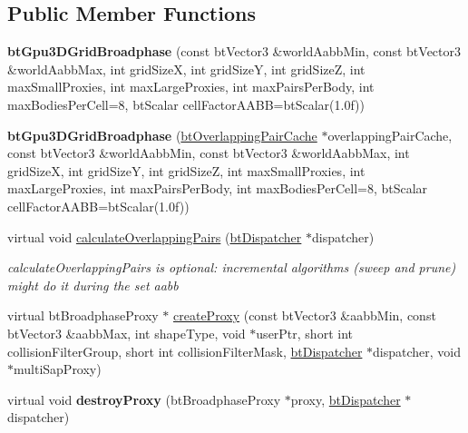 \subsection*{Public Member Functions}
\begin{DoxyCompactItemize}
\item 
\mbox{\label{classbtGpu3DGridBroadphase_a16e59d6930a222fd5118611d4fccf0ba}} 
{\bfseries bt\+Gpu3\+D\+Grid\+Broadphase} (const bt\+Vector3 \&world\+Aabb\+Min, const bt\+Vector3 \&world\+Aabb\+Max, int grid\+SizeX, int grid\+SizeY, int grid\+SizeZ, int max\+Small\+Proxies, int max\+Large\+Proxies, int max\+Pairs\+Per\+Body, int max\+Bodies\+Per\+Cell=8, bt\+Scalar cell\+Factor\+A\+A\+BB=bt\+Scalar(1.\+0f))
\item 
\mbox{\label{classbtGpu3DGridBroadphase_a05fbb3eab41b49d68d270d2cf7d3fa00}} 
{\bfseries bt\+Gpu3\+D\+Grid\+Broadphase} (\hyperlink{classbtOverlappingPairCache}{bt\+Overlapping\+Pair\+Cache} $\ast$overlapping\+Pair\+Cache, const bt\+Vector3 \&world\+Aabb\+Min, const bt\+Vector3 \&world\+Aabb\+Max, int grid\+SizeX, int grid\+SizeY, int grid\+SizeZ, int max\+Small\+Proxies, int max\+Large\+Proxies, int max\+Pairs\+Per\+Body, int max\+Bodies\+Per\+Cell=8, bt\+Scalar cell\+Factor\+A\+A\+BB=bt\+Scalar(1.\+0f))
\item 
virtual void \hyperlink{classbtGpu3DGridBroadphase_ad25b335c5cf7be1f4eee024ff91e5635}{calculate\+Overlapping\+Pairs} (\hyperlink{classbtDispatcher}{bt\+Dispatcher} $\ast$dispatcher)
\begin{DoxyCompactList}\small\item\em calculate\+Overlapping\+Pairs is optional\+: incremental algorithms (sweep and prune) might do it during the set aabb \end{DoxyCompactList}\item 
virtual bt\+Broadphase\+Proxy $\ast$ \hyperlink{classbtGpu3DGridBroadphase_ad381f8a0aca01a7147b7a3eafad9ac5a}{create\+Proxy} (const bt\+Vector3 \&aabb\+Min, const bt\+Vector3 \&aabb\+Max, int shape\+Type, void $\ast$user\+Ptr, short int collision\+Filter\+Group, short int collision\+Filter\+Mask, \hyperlink{classbtDispatcher}{bt\+Dispatcher} $\ast$dispatcher, void $\ast$multi\+Sap\+Proxy)
\item 
\mbox{\label{classbtGpu3DGridBroadphase_ab86c095b13af4025a1ba78c811fc1052}} 
virtual void {\bfseries destroy\+Proxy} (bt\+Broadphase\+Proxy $\ast$proxy, \hyperlink{classbtDispatcher}{bt\+Dispatcher} $\ast$dispatcher)

\end{DoxyCompactItemize}
